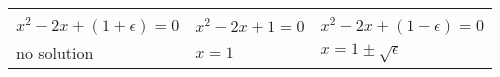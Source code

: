 \newcommand{\sqrtFig}[1]{
    \pgfmathsetmacro{\off}{#1}
    \pgfmathsetmacro{\xmax}{1}
    \draw (-\xmax,0) -- (\xmax,0);
    \draw[domain=-\xmax:\xmax, smooth, variable=\x]  plot ({\x},{\x*\x+#1});
}%
\newcommand{\drawRoots}[1]{
    \pgfmathsetmacro{\ra}{-sqrt(#1)}
    \pgfmathsetmacro{\rb}{sqrt(#1)}
    \tkzDefPoints{\ra/0/R1, \rb/0/R2}
    \tkzDrawPoints(R1,R2)
}%
\tabulinesep=1mm%
\begin{tabu} to .9\linewidth {X[c]X[c]X[c]}
 &
 &
\\
$x^2-2x+(1+\epsilon) = 0$ & $x^2-2x+1 = 0$ & $x^2-2x+(1-\epsilon) = 0$\\
no solution & $x = 1$ & $x = 1 \pm \sqrt{\epsilon}$\\
\end{tabu}
